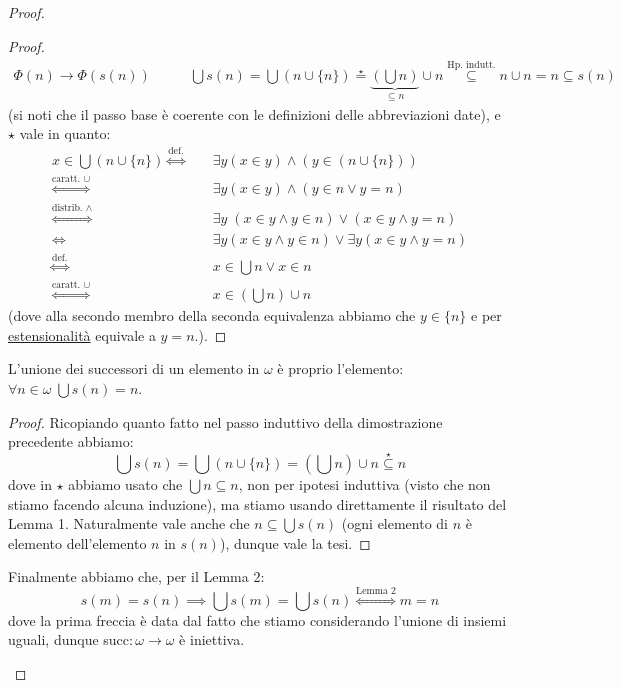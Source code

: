 \begin{proof}
\begin{enumerate}
\begin{proof}
\[\begin{split}
							\boxed{\Phi(n) \rightarrow \Phi(s(n))} & \qquad \bigcup s(n) = \bigcup(n \cup \{n\}) \overset{\star}{=} \underbrace{\left(\bigcup n\right)}_{\subseteq n} \cup n \overset{\text{Hp. indutt.}}{\subseteq} n \cup n = n \subseteq s(n)
							\end{split}
						\]
						(si noti che il passo base è coerente con le definizioni delle abbreviazioni date), e $\star$ vale in quanto:
						\[ \begin{split}
							x \in \bigcup(n \cup \{n\}) \overset{\text{def.}}{\iff} &\quad \exists y ( x \in y) \land (y \in (n \cup\{n\})) \\
														\overset{\text{caratt. $\cup$}}{\iff} &\quad \exists y( x \in y) \land (y \in n \lor y = n)\\
														\overset{\text{distrib. $\land$}}{\iff} &\quad \exists y \; ( x \in y \land y \in n) \lor (x \in y \land y = n)\\
														\iff &\quad \exists y ( x \in y \land y \in n) \lor \exists y(x \in y \land y = n)\\
														\overset{\text{def.}}{\iff} &\quad x \in \bigcup n \lor x \in n\\
														\overset{\text{caratt. $\cup$}}{\iff} &\quad x \in \left(\bigcup n\right) \cup n
						\end{split}
							\]
						(dove alla secondo membro della seconda equivalenza abbiamo che $y \in \{n\}$ e per \hyperref[ax2]{estensionalità} equivale a $y = n$.).
					\end{proof}
					\begin{lemma}
						[Lemma 2]
						L'unione dei successori di un elemento in $\omega$ è proprio l'elemento: $\forall n \in \omega \; \bigcup s(n) = n$.
					\end{lemma}
					\begin{proof}
						Ricopiando quanto fatto nel passo induttivo della dimostrazione precedente abbiamo:
						\[ \bigcup s(n) = \bigcup (n \cup \{n\}) = \left(\bigcup n\right) \cup n \overset{\star}{\subseteq} n
							\]
						dove in $\star$ abbiamo usato che $\bigcup n \subseteq n$, non per ipotesi induttiva (visto che non stiamo facendo alcuna induzione), ma stiamo usando direttamente il risultato del Lemma 1.
						Naturalmente vale anche che $n \subseteq \bigcup s(n)$ (ogni elemento di $n$ è elemento dell'elemento $n$ in $s(n)$), dunque vale la tesi.
					\end{proof}
					Finalmente abbiamo che, per il Lemma 2:
					\[ s(m) = s(n) \implies \bigcup s(m) = \bigcup s(n) \overset{\text{Lemma 2}}{\iff} m = n
						\]
					dove la prima freccia è data dal fatto che stiamo considerando l'unione di insiemi uguali, dunque succ$: \omega \rightarrow \omega$ è iniettiva.
	\end{enumerate}
\end{proof}

